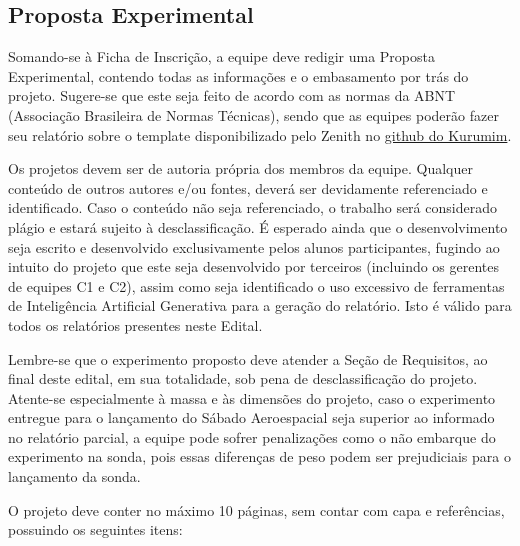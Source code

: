     \subsection{Proposta Experimental}\label{sec:proposta_experimental}
        Somando-se à Ficha de Inscrição, a equipe deve redigir uma Proposta Experimental, contendo todas as informações e o embasamento por trás do projeto. Sugere-se que este seja feito de acordo com as normas da ABNT (Associação Brasileira de Normas Técnicas), sendo que as equipes poderão fazer seu relatório sobre o template disponibilizado pelo Zenith no \href{https://github.com/zenitheesc/kurumim/tree/main/Relat%C3%B3rios}{\color{highcolor} github do Kurumim}.

        Os projetos devem ser de autoria própria dos membros da equipe. 
        Qualquer conteúdo de outros autores e/ou fontes, deverá ser devidamente referenciado e identificado. 
        Caso o conteúdo não seja referenciado, o trabalho será considerado plágio e estará sujeito à 
        desclassificação. É esperado ainda que o desenvolvimento seja escrito e desenvolvido exclusivamente 
        pelos alunos participantes, fugindo ao intuito do projeto que este seja desenvolvido por terceiros 
        (incluindo os gerentes de equipes C1 e C2), assim como seja identificado o uso excessivo de ferramentas
        de Inteligência Artificial Generativa para a geração do relatório. Isto é válido para todos os 
        relatórios presentes neste Edital.

        Lembre-se que o experimento proposto deve atender a Seção de Requisitos, ao final deste edital, 
        em sua totalidade, sob pena de desclassificação do projeto. Atente-se especialmente à massa e às 
        dimensões do projeto, caso o experimento entregue para o lançamento do Sábado Aeroespacial seja superior
        ao informado no relatório parcial, a equipe pode sofrer penalizações como o não embarque do experimento 
        na sonda, pois essas diferenças de peso podem ser prejudiciais para o lançamento da sonda.

        O projeto deve conter no máximo 10 páginas, sem contar com capa e referências, possuindo os seguintes itens:
        
